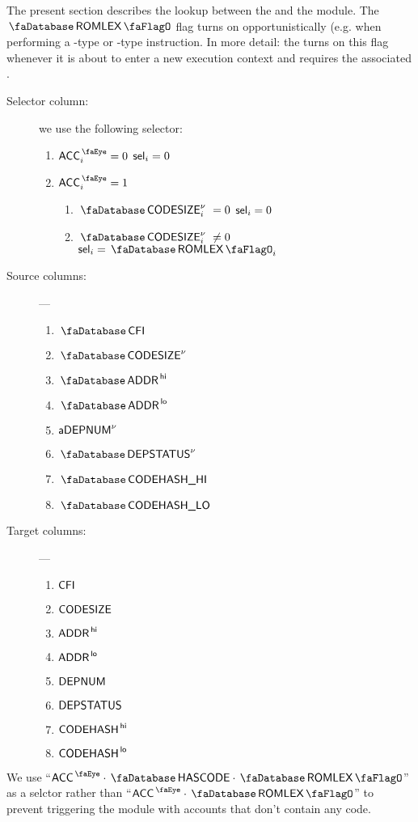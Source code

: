 The present section describes the lookup between the \hubMod{} and the \romLexMod{} module.
The $\accRomLexFlag$ flag turns on opportunistically (e.g. when performing a -type or -type instruction.
In more detail: the \zkEvm{} turns on this flag whenever it is about to enter a new execution context and requires the associated \cfi{}. 
\begin{description}
	\item[Selector column:] we use the following selector:
		\begin{enumerate}
			\item \If $\peekAccount _{i} = 0$ \Then $\textsf{sel} _{i} = 0$
			\item \If $\peekAccount _{i} = 1$ \Then
				\begin{enumerate}
				        \item \If $\accCodesize\new _{i} =    0$ \Then $\textsf{sel} _{i} = 0$
					\item \If $\accCodesize\new _{i} \neq 0$ \Then $\col{sel} _{i} = \accRomLexFlag _{i}$
				\end{enumerate}
		\end{enumerate}
	\item[Source columns:] ---
		\begin{multicols}{4}
			\begin{enumerate}
				\item $\accCfi$
				\item $\accCodesize\new$
				\item $\accAddressHi$
				\item $\accAddressLo$
				\item $\textsf{a}\textsf{DEPNUM}^{\nu}$
				\item $\accDepStatus\new$
				\item $\accCodehashHi$
				\item $\accCodehashLo$
			\end{enumerate}
		\end{multicols}
	\item[Target columns:] ---
		\begin{multicols}{4}
			\begin{enumerate}
				\item $\textsf{CFI}$
				\item $\textsf{CODESIZE}$
				\item $\textsf{ADDR}^{\mathsf{\,hi}}$
				\item $\textsf{ADDR}^{\mathsf{\,lo}}$
				\item $\textsf{DEPNUM}$
				\item $\textsf{DEPSTATUS}$
				\item $\textsf{CODEHASH}^{\mathsf{\,hi}}$
				\item $\textsf{CODEHASH}^{\mathsf{\,lo}}$
			\end{enumerate}
		\end{multicols}
\end{description}
\saNote{} We use ``$\peekAccount \cdot \accHasCode \cdot \accRomLexFlag$'' as a selctor rather than ``$\peekAccount \cdot \accRomLexFlag$'' to prevent triggering the \romLexMod{} module with accounts that don't contain any code.
